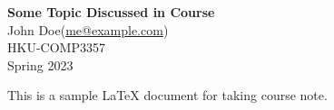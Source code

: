 \documentclass[11pt]{article}
\makeatletter
\def\title{Some Topic Discussed in Course}
\def\coursecode{COMP3357}
\def\authorname{John Doe}
\def\authoremail{me@example.com}
\def\semester{Spring 2023}
\makeatother
\begin{document}
\thispagestyle{empty}

\begin{center}
{\LARGE \bf \title}\\
{\large \authorname \space (\href{mailto:\authoremail}{\authoremail})}\\ 
{\large HKU-\coursecode}\\
{\semester}
\end{center}

This is a sample LaTeX document for taking course note.
\end{document}

